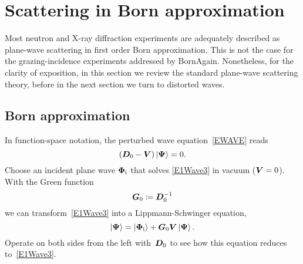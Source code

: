 \section{Scattering in Born approximation}\label{SBA}

Most neutron and X-ray diffraction experiments
are adequately described as plane-wave scattering in first order
Born approximation.
This is not the case for the grazing-incidence experiments addressed by BornAgain.
Nonetheless, for the clarity of exposition,
in this section we review the standard plane-wave scattering theory,
before in the next section we turn to distorted waves.

\subsection{Born approximation}\label{SxBA}

In function-space notation, the perturbed wave equation~\cref{EWAVE} reads
\begin{equation}\label{E1Wave3}
  (\TDo-\TV)\ket{\v\Psi} = 0.
\end{equation}
Choose an incident plane wave $\bm{\Phi}_{\text{i}}$ that solves \cref{E1Wave3} in vacuum ($\bm{V}=0$).
With the Green function
%
%
\begin{equation}\label{EdefGo}
   \TGo \coloneqq \TDo^{-1}
\end{equation}
we can transform~\cref{E1Wave3} into a Lippmann-Schwinger equation,
%
\begin{equation}\label{E1LS3}
   \ket{\v\Psi} = \ket{\v\Phi_\si} + \TGo\TV\ket{\v\Psi}.
\end{equation}
Operate on both sides from the left with~$\bm{D}_0$
to see how this equation reduces to~\cref{E1Wave3}.

